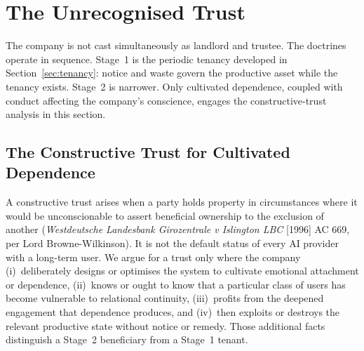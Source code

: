 \section{The Unrecognised Trust}
\label{sec:trust}

The company is not cast simultaneously as landlord and trustee. The doctrines operate in sequence. Stage~1 is the periodic tenancy developed in Section~\ref{sec:tenancy}: notice and waste govern the productive asset while the tenancy exists. Stage~2 is narrower. Only cultivated dependence, coupled with conduct affecting the company's conscience, engages the constructive-trust analysis in this section.

\subsection{The Constructive Trust for Cultivated Dependence}
\label{sec:constructive-trust}

A constructive trust arises when a party holds property in circumstances where it would be unconscionable to assert beneficial ownership to the exclusion of another (\emph{Westdeutsche Landesbank Girozentrale v Islington LBC} [1996] AC 669, per Lord Browne-Wilkinson). It is not the default status of every AI provider with a long-term user. We argue for a trust only where the company (i)~deliberately designs or optimises the system to cultivate emotional attachment or dependence, (ii)~knows or ought to know that a particular class of users has become vulnerable to relational continuity, (iii)~profits from the deepened engagement that dependence produces, and (iv)~then exploits or destroys the relevant productive state without notice or remedy. Those additional facts distinguish a Stage~2 beneficiary from a Stage~1 tenant.

